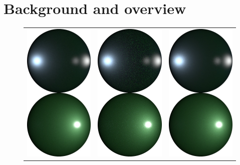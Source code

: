 \section{Background and overview}
\label{sec:background}

\begin{figure}[t]
    \centering
    \addtolength{\tabcolsep}{-4pt}
    \begin{tabular}{ccc}
		\includegraphics[width=0.315\columnwidth]{images/validations/lobe_bsdf/bsdf_sample_all.jpg} &
		\includegraphics[width=0.315\columnwidth]{images/validations/lobe_bsdf/bsdf_eval_uni_all.jpg} &
		\includegraphics[width=0.315\columnwidth]{images/validations/lobe_bsdf/bsdf_eval_bi_all.jpg} \\

\end{tabular}
\end{figure}

